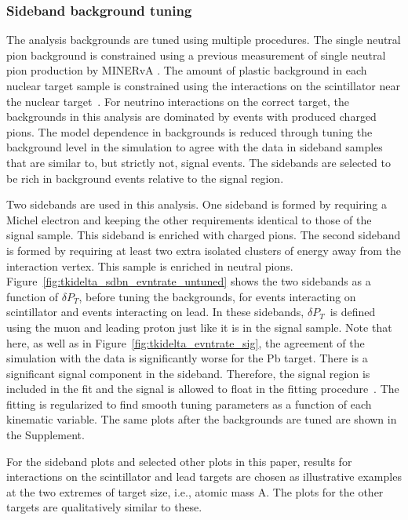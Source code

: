 \documentclass[aps,prd,twocolumn,showpacs,superscriptaddress,floatfix]{revtex4-2}  %
\newcommand{\tkidelta}{\ensuremath{\delta P_{T}}\xspace}
\begin{document}
\subsubsection{Sideband background tuning}

The analysis backgrounds are tuned using multiple procedures.  The single neutral pion background is constrained using a previous measurement of single neutral pion production by MINERvA \cite{pi0_paper}.  The amount of plastic background in each nuclear target sample is constrained using the interactions on the scintillator near the nuclear target~\cite{jk_1trk_prl}.  
For neutrino interactions on the correct target, the backgrounds in this analysis are dominated by events with produced charged pions.  The model dependence in backgrounds is reduced through tuning the background level in the simulation to agree with the data in sideband samples that are similar to, but strictly not, signal events.  The sidebands are selected to be rich in background events relative to the signal region.  


Two sidebands are used in this analysis.  One sideband is formed by 
requiring a Michel electron and keeping the other requirements identical to those of the signal sample. 
This sideband is enriched with charged pions.  The second sideband  
is formed by requiring
at least two extra isolated clusters of energy away from the interaction vertex.  This sample is enriched in neutral pions.  Figure~\ref{fig:tkidelta_sdbn_evntrate_untuned} shows the two sidebands as a function of \tkidelta , before tuning the backgrounds, for events interacting on scintillator and events interacting on lead.  In these sidebands, \tkidelta \ is defined using the muon and leading proton just like it is in the signal sample.  Note that here, as well as in 
Figure~\ref{fig:tkidelta_evntrate_sig}, the agreement of the simulation with the data is significantly worse for the Pb target.  There is a significant signal component in the sideband.  Therefore, the signal region is included in the fit and the signal is allowed to float in the fitting procedure~\cite{jk_1trk_prl}. The fitting is regularized to find smooth tuning parameters as a function of each kinematic variable. %
The same plots after the backgrounds are tuned are shown in the Supplement. 

For the sideband plots and selected other plots in this paper, results for interactions on the scintillator and lead targets are chosen as illustrative examples at the two extremes of target size, i.e., atomic mass A. The plots for the other targets are qualitatively similar to these.  
\end{document}
